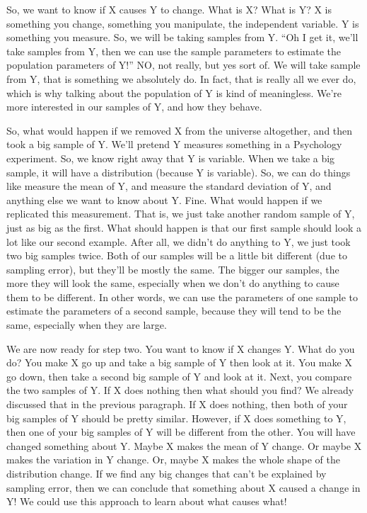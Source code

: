 \documentclass[
  letterpaper,
  DIV=11,
  numbers=noendperiod]{scrreprt}
\begin{document}
So, we want to know if X causes Y to change. What is X? What is Y? X is
something you change, something you manipulate, the independent
variable. Y is something you measure. So, we will be taking samples from
Y. ``Oh I get it, we'll take samples from Y, then we can use the sample
parameters to estimate the population parameters of Y!'' NO, not really,
but yes sort of. We will take sample from Y, that is something we
absolutely do. In fact, that is really all we ever do, which is why
talking about the population of Y is kind of meaningless. We're more
interested in our samples of Y, and how they behave.

So, what would happen if we removed X from the universe altogether, and
then took a big sample of Y. We'll pretend Y measures something in a
Psychology experiment. So, we know right away that Y is variable. When
we take a big sample, it will have a distribution (because Y is
variable). So, we can do things like measure the mean of Y, and measure
the standard deviation of Y, and anything else we want to know about Y.
Fine. What would happen if we replicated this measurement. That is, we
just take another random sample of Y, just as big as the first. What
should happen is that our first sample should look a lot like our second
example. After all, we didn't do anything to Y, we just took two big
samples twice. Both of our samples will be a little bit different (due
to sampling error), but they'll be mostly the same. The bigger our
samples, the more they will look the same, especially when we don't do
anything to cause them to be different. In other words, we can use the
parameters of one sample to estimate the parameters of a second sample,
because they will tend to be the same, especially when they are large.

We are now ready for step two. You want to know if X changes Y. What do
you do? You make X go up and take a big sample of Y then look at it. You
make X go down, then take a second big sample of Y and look at it. Next,
you compare the two samples of Y. If X does nothing then what should you
find? We already discussed that in the previous paragraph. If X does
nothing, then both of your big samples of Y should be pretty similar.
However, if X does something to Y, then one of your big samples of Y
will be different from the other. You will have changed something about
Y. Maybe X makes the mean of Y change. Or maybe X makes the variation in
Y change. Or, maybe X makes the whole shape of the distribution change.
If we find any big changes that can't be explained by sampling error,
then we can conclude that something about X caused a change in Y! We
could use this approach to learn about what causes what!
\end{document}
